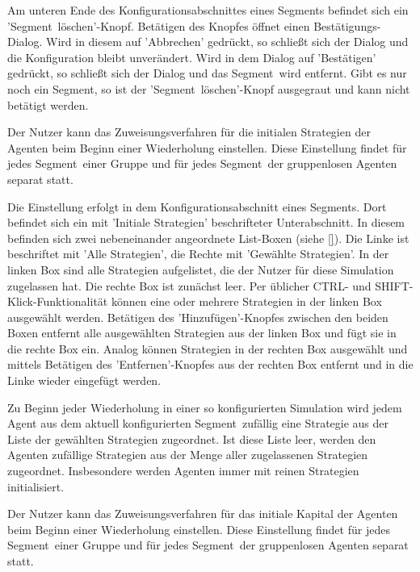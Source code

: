 \documentclass[parskip=full,11pt,twoside]{scrartcl}
\def\segment{Segment}
\begin{document}
Am unteren Ende des Konfigurationsabschnittes eines \segment s befindet sich ein '\segment\ löschen'-Knopf. Betätigen des Knopfes öffnet einen Bestätigungs-Dialog. Wird in diesem auf 'Abbrechen' gedrückt, so schließt sich der Dialog und die Konfiguration bleibt unverändert. Wird in dem Dialog auf 'Bestätigen' gedrückt, so schließt sich der Dialog und das \segment\ wird entfernt. Gibt es nur noch ein \segment, so ist der '\segment\ löschen'-Knopf ausgegraut und kann nicht betätigt werden.

Der Nutzer kann das Zuweisungsverfahren für die initialen Strategien der Agenten beim Beginn einer Wiederholung einstellen. Diese Einstellung findet für jedes \segment\ einer Gruppe und für jedes \segment\ der gruppenlosen Agenten separat statt.

Die Einstellung erfolgt in dem Konfigurationsabschnitt eines \segment s. Dort befindet sich ein mit 'Initiale Strategien' beschrifteter Unterabschnitt. In diesem befinden sich zwei nebeneinander angeordnete List-Boxen (siehe \cref{}). Die Linke ist beschriftet mit 'Alle Strategien', die Rechte mit 'Gewählte Strategien'. In der linken Box sind alle Strategien aufgelistet, die der Nutzer für diese Simulation zugelassen hat. Die rechte Box ist zunächst leer. Per üblicher \textsf{CTRL}- und \textsf{SHIFT}-Klick-Funktionalität können eine oder mehrere Strategien in der linken Box ausgewählt werden. Betätigen des 'Hinzufügen'-Knopfes zwischen den beiden Boxen entfernt alle ausgewählten Strategien aus der linken Box und fügt sie in die rechte Box ein. Analog können Strategien in der rechten Box ausgewählt und mittels Betätigen des 'Entfernen'-Knopfes aus der rechten Box entfernt und in die Linke wieder eingefügt werden.

Zu Beginn jeder Wiederholung in einer so konfigurierten Simulation wird jedem Agent aus dem aktuell konfigurierten \segment\ zufällig eine Strategie aus der Liste der gewählten Strategien zugeordnet. Ist diese Liste leer, werden den Agenten zufällige Strategien aus der Menge aller zugelassenen Strategien zugeordnet. Insbesondere werden Agenten immer mit reinen Strategien initialisiert.

Der Nutzer kann das Zuweisungsverfahren für das initiale Kapital der Agenten beim Beginn einer Wiederholung einstellen. Diese Einstellung findet für jedes \segment\ einer Gruppe und für jedes \segment\ der gruppenlosen Agenten separat statt.
\end{document}
